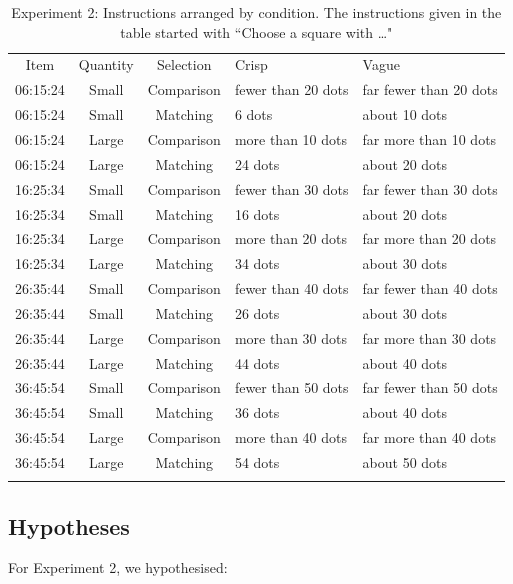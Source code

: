 \begin{table}
\centering
\caption{Experiment 2: Instructions arranged by condition. The instructions given in the table started with ``Choose a square with \ldots"} 
\label{Instructions for e2}
\begin{tabular}{cccll}
\hline\noalign{\smallskip}
Item & Quantity & Selection & Crisp & Vague \\ 
\noalign{\smallskip}\hline\noalign{\smallskip}
06:15:24 & Small & Comparison & fewer than 20 dots & far fewer than 20 dots \\ 
06:15:24 & Small & Matching & 6 dots & about 10 dots \\ 
06:15:24 & Large & Comparison & more than 10 dots & far more than 10 dots \\ 
06:15:24 & Large & Matching & 24 dots & about 20 dots \\ 
\noalign{\smallskip}\hline\noalign{\smallskip}
16:25:34 & Small & Comparison & fewer than 30 dots & far fewer than 30 dots \\ 
16:25:34 & Small & Matching & 16 dots & about 20 dots \\ 
16:25:34 & Large & Comparison & more than 20 dots & far more than 20 dots \\ 
16:25:34 & Large & Matching & 34 dots & about 30 dots \\ 
\noalign{\smallskip}\hline\noalign{\smallskip}
26:35:44 & Small & Comparison & fewer than 40 dots & far fewer than 40 dots \\ 
26:35:44 & Small & Matching & 26 dots & about 30 dots \\ 
26:35:44 & Large & Comparison & more than 30 dots & far more than 30 dots \\ 
26:35:44 & Large & Matching & 44 dots & about 40 dots \\ 
\noalign{\smallskip}\hline\noalign{\smallskip}
36:45:54 & Small & Comparison & fewer than 50 dots & far fewer than 50 dots \\ 
36:45:54 & Small & Matching & 36 dots & about 40 dots \\ 
36:45:54 & Large & Comparison & more than 40 dots & far more than 40 dots \\ 
36:45:54 & Large & Matching & 54 dots & about 50 dots \\ 
\noalign{\smallskip}\hline
\end{tabular}
\end{table}

\subsection{Hypotheses} %
\noindent For Experiment 2, we hypothesised:


